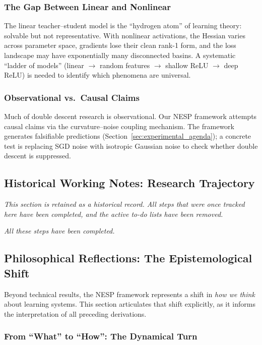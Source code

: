 \documentclass[
  journal=largetwo,
  simfonts=false,
  year=2025,
  volume=37,
]{cup-journal}
\begin{document}
\subsubsection{The Gap Between Linear and Nonlinear}
The linear teacher--student model is the ``hydrogen atom'' of learning theory: solvable but not representative. With nonlinear activations, the Hessian varies across parameter space, gradients lose their clean rank-1 form, and the loss landscape may have exponentially many disconnected basins. A systematic ``ladder of models'' (linear $\to$ random features $\to$ shallow ReLU $\to$ deep ReLU) is needed to identify which phenomena are universal.

\subsubsection{Observational vs.\ Causal Claims}
Much of double descent research is observational. Our NESP framework attempts causal claims via the curvature--noise coupling mechanism. The framework generates falsifiable predictions (Section~\ref{sec:experimental_agenda}); a concrete test is replacing SGD noise with isotropic Gaussian noise to check whether double descent is suppressed.

\subsection{Historical Working Notes: Research Trajectory}\label{app:author_notes}

\textit{This section is retained as a historical record. All steps that were once tracked here have been completed, and the active to-do lists have been removed.}

\textit{All these steps have been completed.}

\subsection{Philosophical Reflections: The Epistemological Shift}\label{app:philosophy}

Beyond technical results, the NESP framework represents a shift in \textit{how we think} about learning systems. This section articulates that shift explicitly, as it informs the interpretation of all preceding derivations.

\subsubsection{From ``What'' to ``How'': The Dynamical Turn}
\end{document}
